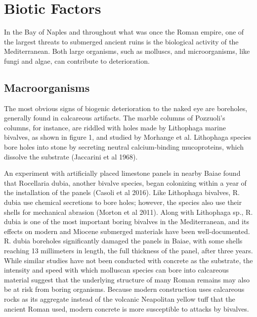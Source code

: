 \documentclass[12pt]{article}
\begin{document}
\section*{Biotic Factors}

In the Bay of Naples and throughout what was once the Roman empire, one of the largest threats to submerged ancient ruins is the biological activity of the Mediterranean.  Both large organisms, such as molluscs, and microorganisms, like fungi and algae, can contribute to deterioration.   
\subsection*{Macroorganisms}

The most obvious signs of biogenic deterioration to the naked eye are boreholes, generally found in calcareous artifacts.  The marble columns of Pozzuoli’s columns, for instance, are riddled with holes made by Lithophaga marine bivalves, as shown in figure 1, and studied by Morhange et al.  Lithophaga species bore holes into stone by secreting neutral calcium-binding mucoproteins, which dissolve the substrate (Jaccarini et al 1968).

An experiment with artificially placed limestone panels in nearby Baiae found that Rocellaria dubia, another bivalve species, began colonizing within a year of the installation of the panels (Casoli et al 2016).  Like Lithophaga bivalves, R. dubia use chemical secretions to bore holes; however, the species also use their shells for mechanical abrasion (Morton et al 2011).  Along with Lithophaga sp., R. dubia is one of the most important boring bivalves in the Mediterranean, and its effects on modern and Miocene submerged materials have been well-documented.  R. dubia boreholes significantly damaged the panels in Baiae, with some shells reaching 13 millimeters in length, the full thickness of the panel, after three years.  While similar studies have not been conducted with concrete as the substrate, the intensity and speed with which molluscan species can bore into calcareous material suggest that the underlying structure of many Roman remains may also be at risk from boring organisms.  Because modern construction uses calcareous rocks as its aggregate instead of the volcanic Neapolitan yellow tuff that the ancient Roman used, modern concrete is more susceptible to attacks by bivalves.
\end{document}
